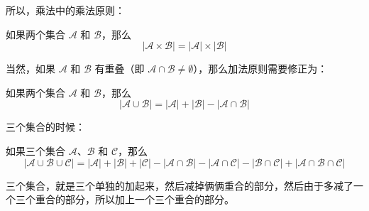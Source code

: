 \documentclass[lang=cn,math=mtpro2,11pt,scheme=chinese,pad]{elegantbook}
\begin{document}
所以，乘法中的乘法原则：
\begin{theorem}[（集合）乘法原则]
  如果两个集合 \(\mathcal{A}\) 和 \(\mathcal{B}\)，那么
  \[
  |\mathcal{A} \times \mathcal{B}| = |\mathcal{A}| \times |\mathcal{B}|
  \]
\end{theorem}

当然，如果 \(\mathcal{A}\) 和 \(\mathcal{B}\) 有重叠（即 \(\mathcal{A} \cap \mathcal{B} \neq \emptyset\)），那么加法原则需要修正为：
\begin{theorem}[（集合）加法原则（修正）]
  如果两个集合 \(\mathcal{A}\) 和 \(\mathcal{B}\)，那么
  \[
  |\mathcal{A} \cup \mathcal{B}| = |\mathcal{A}| + |\mathcal{B}| - |\mathcal{A} \cap \mathcal{B}|
  \]
\end{theorem}
三个集合的时候：
\begin{theorem}[（集合）加法原则（修正）]
如果三个集合 \(\mathcal{A}\)、\(\mathcal{B}\) 和 \(\mathcal{C}\)，那么
\[
|\mathcal{A} \cup \mathcal{B} \cup \mathcal{C}| = |\mathcal{A}| + |\mathcal{B}| + |\mathcal{C}| - |\mathcal{A} \cap \mathcal{B}| - |\mathcal{A} \cap \mathcal{C}| - |\mathcal{B} \cap \mathcal{C}| + |\mathcal{A} \cap \mathcal{B} \cap \mathcal{C}|
\]
\end{theorem}
\begin{note}
  三个集合，就是三个单独的加起来，然后减掉俩俩重合的部分，然后由于多减了一个三个重合的部分，所以加上一个三个重合的部分。
\end{note}
\end{document}
